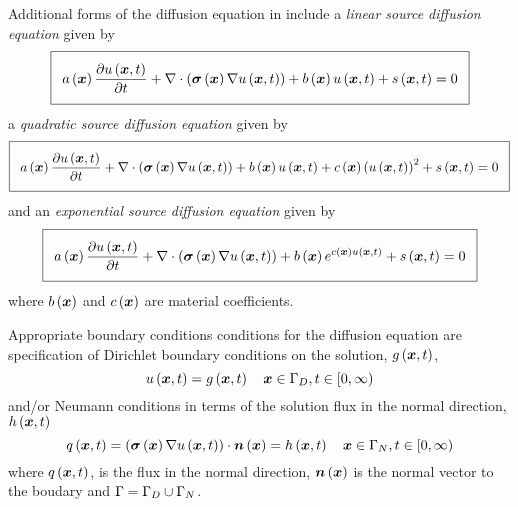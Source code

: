 Additional forms of the diffusion equation in \OpenCMISS include a \emph{linear
  source diffusion equation} given by
\begin{equation}
  \addtolength{\fboxsep}{5pt}
  \boxed{
    \begin{gathered}
      \fnof{a}{\vectr{x}}\delby{\fnof{u}{\vectr{x},t}}{t}+\divergence{}{\pbrac{\fnof{\tensor{\sigma}}{\vectr{x}}
          \gradient{}{\fnof{u}{\vectr{x},t}}}}
      +\fnof{b}{\vectr{x}}\fnof{u}{\vectr{x},t}+\fnof{s}{\vectr{x},t}=0
    \end{gathered}
  } 
  \label{eqn:LinearSourceDiffusionEquation}
\end{equation}
a \emph{quadratic source diffusion equation} given by
\begin{equation}
  \addtolength{\fboxsep}{5pt}
  \boxed{
    \begin{gathered}
      \fnof{a}{\vectr{x}}\delby{\fnof{u}{\vectr{x},t}}{t}+\divergence{}{\pbrac{\fnof{\tensor{\sigma}}{\vectr{x}}
          \gradient{}{\fnof{u}{\vectr{x},t}}}}
      +\fnof{b}{\vectr{x}}\fnof{u}{\vectr{x},t}+\fnof{c}{\vectr{x}}\pbrac{\fnof{u}{\vectr{x},t}}^{2}+
      \fnof{s}{\vectr{x},t}=0
    \end{gathered}
  }
  \label{eqn:QuadraticSourceDiffusionEquation}
\end{equation}
and an \emph{exponential source diffusion equation} given by
\begin{equation}
  \addtolength{\fboxsep}{5pt}
  \boxed{
    \begin{gathered}
      \fnof{a}{\vectr{x}}\delby{\fnof{u}{\vectr{x},t}}{t}+\divergence{}{\pbrac{\fnof{\tensor{\sigma}}{\vectr{x}}
          \gradient{}{\fnof{u}{\vectr{x},t}}}}
      +\fnof{b}{\vectr{x}}e^{\fnof{c}{\vectr{x}}\fnof{u}{\vectr{x},t}}+\fnof{s}{\vectr{x},t}=0
    \end{gathered}
  }
  \label{eqn:ExponentialSourceDiffusionEquation}
\end{equation}
where $ b\left(  \boldsymbol{x}  \right) $ and $ c\left(  \boldsymbol{x}  \right) $ are material
coefficients.

Appropriate boundary conditions conditions for the diffusion
equation are specification of Dirichlet boundary conditions on the solution,
$ g\left(  \boldsymbol{x} ,t \right) $, \ie
\begin{equation}
  \fnof{u}{\vectr{x},t} = \fnof{g}{\vectr{x},t} \quad \vectr{x}\in\Gamma_{D},t\in[0,\infty)
  \label{eqn:diffusionDirichletBC} 
\end{equation}
and/or Neumann conditions in terms of the solution flux in the normal
direction, $ h\left(  \boldsymbol{x} ,t \right) $ \ie
\begin{equation}
  \fnof{q}{\vectr{x},t} = \dotprod{\pbrac{\fnof{\tensor{\sigma}}{\vectr{x}}
      \gradient{}{\fnof{u}{\vectr{x},t}}}}{\fnof{\normal}{\vectr{x}}} =
  \fnof{h}{\vectr{x},t} \quad \vectr{x}\in\Gamma_{N},t\in[0,\infty)
  \label{eqn:diffusionNeumannBC} 
\end{equation}
where $ q\left(  \boldsymbol{x} ,t \right) $, is the flux in the normal direction, $  \boldsymbol{n} \left(  \boldsymbol{x}  \right) $ is the normal
vector to the boudary and $\Gamma=\Gamma_{D}\cup\Gamma_{N}$.

